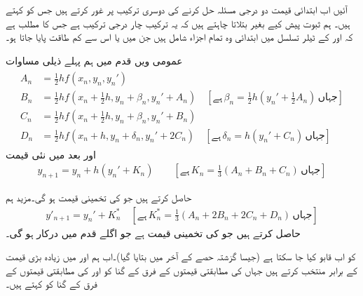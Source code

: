 آئیں اب ابتدائی قیمت دو درجی مسئلہ حل کرنے کی دوسری ترکیب پر غور کرتے ہیں جس کو  کہتے ہیں۔ ہم ثبوت پیش کیے  بغیر بتلاتا چاہتے ہیں کہ یہ ترکیب چار درجی ترکیب ہے جس کا مطلب ہے کہ  اور  کے ٹیلر تسلسل میں ابتدائی وہ تمام اجزاء شامل ہیں جن  میں   یا اس سے کم طاقت پایا جاتا ہو۔  

عمومی  ویں قدم میں ہم پہلے ذیلی مساوات
\begin{gather}
\begin{aligned}\label{مساوات_اعدادی_رنج_کوٹا_نیستروم_الف}
A_n&=\tfrac{1}{2}h f(x_n,y_n,y_n')\\
B_n&=\tfrac{1}{2}hf(x_n+\tfrac{1}{2}h,y_n+\beta_n,y_n'+A_n)\quad [\text{ہے}\, \beta_n=\tfrac{1}{2}h(y_n'+\tfrac{1}{2}A_n)\,\text{جہاں}]\\
C_n&=\tfrac{1}{2}h f(x_n+\tfrac{1}{2}h,y_n+\beta_n,y_n'+B_n)\\
D_n&=\tfrac{1}{2}hf(x_n+h,y_n+\delta_n,y_n'+2C_n)\quad [\text{ہے}\, \delta_n=h(y_n'+C_n)\, \text{جہاں}]
\end{aligned}
\end{gather}
اور بعد میں نئی قیمت
\begin{align}\label{مساوات_اعدادی_رنج_کوٹا_نیستروم_ب}
y_{n+1}=y_n+h(y_n'+K_n)\quad \quad [\text{ہے}\, K_n=\tfrac{1}{3}(A_n+B_n+C_n)\,\text{جہاں}]
\end{align}

حاصل کرتے ہیں جو  کی تخمینی قیمت ہو گی۔مزید ہم
\begin{align}\label{مساوات_اعدادی_رنج_کوٹا_نیستروم_پ}
y'_{n+1}=y_n'+K_n^*\quad [\text{ہے}\, K_n^*=\tfrac{1}{3}(A_n+2B_n+2C_n+D_n)\,\text{جہاں}]
\end{align}
حاصل کرتے ہیں جو  کی تخمینی قیمت ہے جو اگلے قدم میں درکار ہو گی۔

 کو اب قابو کیا جا سکتا ہے (جیسا گزشتہ حصے کے آخر میں بتایا گیا)۔اب ہم  اور  میں زیادہ بڑی قیمت کے برابر منتخب کرتے ہیں جہاں  کی مطابقتی قیمتوں کے فرق کے  گنا کو  اور  کی مطابقتی قیمتوں کے فرق  کے  گنا کو  کہتے ہیں۔

